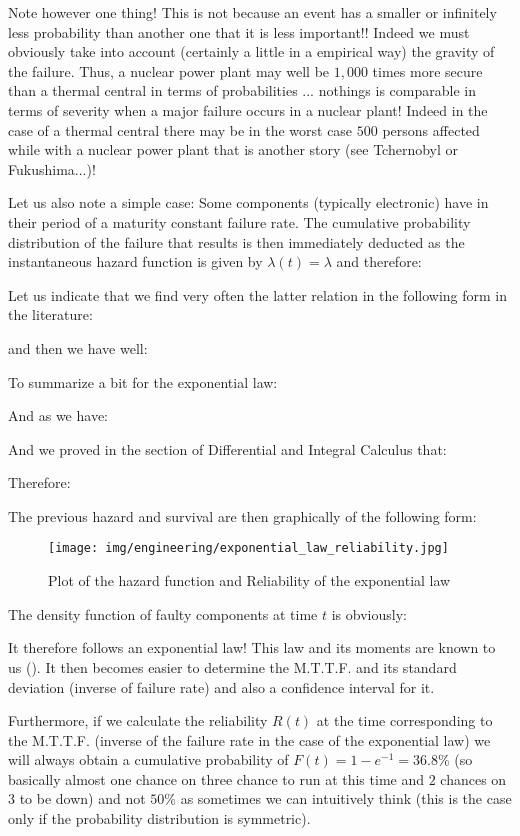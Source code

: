 		Note however one thing! This is not because an event has a smaller or infinitely less probability than another one that it is less important!! Indeed we must obviously take into account (certainly a little in a empirical way) the gravity of the failure. Thus, a nuclear power plant may well be $1,000$ times more secure than a thermal central in terms of probabilities ... nothings is comparable in terms of severity when a major failure occurs in a nuclear plant! Indeed in the case of a thermal central there may be in the worst case $500$ persons affected while with a nuclear power plant that is another story (see Tchernobyl or Fukushima...)!
		
		Let us also note a simple case: Some components (typically electronic) have in their period of a maturity constant failure rate. The cumulative probability distribution of the failure that results is then immediately deducted as the instantaneous hazard function is given by $\lambda(t)=\lambda$ and therefore:
	
	Let us indicate that we find very often the latter relation in the following form in the literature:
	
	and then we have well:
	
	To summarize a bit for the exponential law:
	
	And as we have:
	
	And we proved in the section of Differential and Integral Calculus that:
	
	Therefore:
	
	The previous hazard and survival are then graphically of the following form:
	\begin{figure}[H]
		\centering
		\texttt{[image: img/engineering/exponential\_law\_reliability.jpg]}
		\caption{Plot of the hazard function and Reliability of the exponential law}
	\end{figure}	
	The density function of faulty components at time $t$ is obviously:
	
	It therefore follows an exponential law! This law and its moments are known to us (). It then becomes easier to determine the M.T.T.F. and its standard deviation (inverse of failure rate) and also a confidence interval for it.
	
	Furthermore, if we calculate the reliability $R(t)$ at the time corresponding to the M.T.T.F. (inverse of the failure rate in the case of the exponential law) we will always obtain a cumulative probability of $F(t)=1-e^{-1}=36.8\%$ (so basically almost one chance on three chance to run at this time and $2$ chances on $3$ to be down) and not $50\%$ as sometimes we can intuitively think (this is the case only if the probability distribution is symmetric).
	

